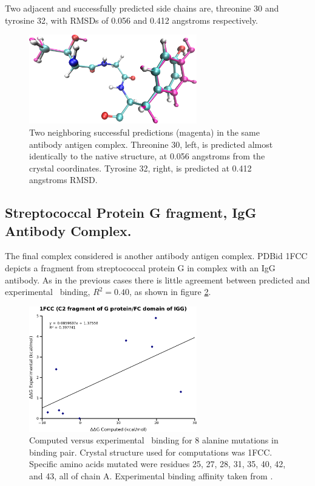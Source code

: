Two adjacent and successfully predicted side chains are, threonine 30 and tyrosine 32, with RMSDs of 0.056 and 0.412 angstroms respectively.
\begin{figure}[h]
    \centering
    \includegraphics[width=0.65\textwidth,height=0.3\textheight,keepaspectratio]{figures/mutation_side_chain_images/1dvf_chain_b_30_and_32.png}
    \caption{Two neighboring successful predictions (magenta) in the same antibody antigen complex.
    Threonine 30, left, is predicted almost identically to the native structure, at 0.056 angstroms from the crystal coordinates.
    Tyrosine 32, right, is predicted at 0.412 angstroms RMSD.}
    \label{figure:computational_mutation_scanning/1DVF_B_30_and_32}
\end{figure}

\FloatBarrier
\subsection{Streptococcal Protein G fragment, IgG Antibody Complex.}
The final complex considered is another antibody antigen complex.
PDBid 1FCC depicts a fragment from streptococcal protein G in complex with an IgG antibody.
As in the previous cases there is little agreement between predicted and experimental \ddg\ binding, $R^{2}=0.40$, as shown in figure \ref{figure:computational_mutation_scanning/1FCC_ddg}.

\begin{figure}[h]
    \centering
    \includegraphics[width=0.65\textwidth]{figures/1fcc.png}
    \caption{Computed versus experimental \ddg\ binding for 8 alanine mutations in  binding pair.
    Crystal structure used for computations was 1FCC.
    Specific amino acids mutated were residues 25, 27, 28, 31, 35, 40, 42, and 43, all of chain A.
    Experimental binding affinity taken from \protect\cite{thorn2001asedb}.}
    \label{figure:computational_mutation_scanning/1FCC_ddg}
\end{figure}

